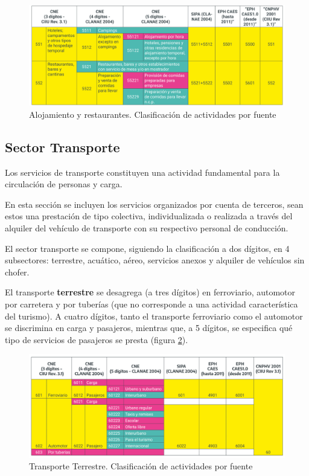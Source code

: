 \documentclass[
  openany]{book}
\begin{document}
\begin{figure}

{\centering \includegraphics[width=1\linewidth]{imagenes/figura3.5} 

}

\caption{Alojamiento y restaurantes. Clasificación de actividades por fuente}\label{fig:empleofuentes5}
\end{figure}

\hypertarget{sector-transporte}{%
\subsection{Sector Transporte}\label{sector-transporte}}

Los servicios de transporte constituyen una actividad fundamental para la circulación de personas y carga.

En esta sección se incluyen los servicios organizados por cuenta de terceros, sean estos una prestación de tipo colectiva, individualizada o realizada a través del alquiler del vehículo de transporte con su respectivo personal de conducción.

El sector transporte se compone, siguiendo la clasificación a dos dígitos, en 4 subsectores: terrestre, acuático, aéreo, servicios anexos y alquiler de vehículos sin chofer.

El transporte \textbf{terrestre} se desagrega (a tres dígitos) en ferroviario, automotor por carretera y por tuberías (que no corresponde a una actividad característica del turismo).
A cuatro dígitos, tanto el transporte ferroviario como el automotor se discrimina en carga y pasajeros, mientras que, a 5 dígitos, se especifica qué tipo de servicios de pasajeros se presta (figura \ref{fig:empleofuentes6}).

\begin{figure}

{\centering \includegraphics[width=1\linewidth]{imagenes/figura3.6} 

}

\caption{Transporte Terrestre. Clasificación de actividades por fuente}\label{fig:empleofuentes6}
\end{figure}
\end{document}
